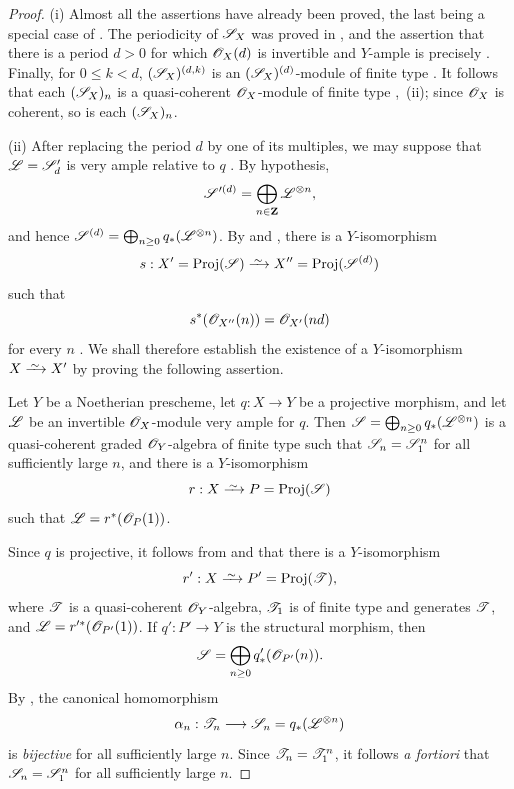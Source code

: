 \begin{proof}
(i) Almost all the assertions have already been proved, the last being a special case of .
The periodicity of $\mathscr{S}_X$ was proved in , and the assertion that there is a period $d>0$ for which $\mathscr{O}_X(d)$ is invertible and $Y$-ample is precisely .
Finally, for $0\leq k<d$, $(\mathscr{S}_X)^{(d,k)}$ is an $(\mathscr{S}_X)^{(d)}$-module of finite type .
It follows that each $(\mathscr{S}_X)_n$ is a quasi-coherent $\mathscr{O}_X$-module of finite type ,~(ii); since $\mathscr{O}_X$ is coherent, so is each $(\mathscr{S}_X)_n$.

(ii) After replacing the period $d$ by one of its multiples, we may suppose that $\mathscr{L}=\mathscr{S}'_d$
is very ample relative to $q$ .
By hypothesis,
\[
  \mathscr{S}'^{(d)}
  =\bigoplus_{n\in\mathbf{Z}}\mathscr{L}^{\otimes n},
\]
and hence $\mathscr{S}^{(d)}
=\bigoplus_{n\geq0}q_*(\mathscr{L}^{\otimes n})$.
By  and , there is a $Y$-isomorphism
\[
  s:X'=\Proj(\sh{S})\simto
  X''=\Proj(\sh{S}^{(d)})
\]
such that
\[
  s^*(\mathscr{O}_{X''}(n))=\mathscr{O}_{X'}(nd)
\]
for every $n$ .
We shall therefore establish the existence of a $Y$-isomorphism $X\simto X'$ by proving the following assertion.

\begin{proposition}[2.3.4.1]
\label{III.2.3.4.1}
Let $Y$ be a Noetherian prescheme, let $q:X\to Y$ be a projective morphism, and let $\mathscr{L}$ be an invertible $\mathscr{O}_X$-module very ample for $q$.
Then $\mathscr{S}=\bigoplus_{n\geq0}q_*(\mathscr{L}^{\otimes n})$
is a quasi-coherent graded $\mathscr{O}_Y$-algebra of finite type such that $\mathscr{S}_n=\mathscr{S}_1^n$
for all sufficiently large $n$, and there is a $Y$-isomorphism
\[
  r:X\simto P=\Proj(\sh{S})
\]
such that $\mathscr{L}=r^*(\mathscr{O}_P(1))$.
\end{proposition}

Since $q$ is projective, it follows from  and  that there is a $Y$-isomorphism
\[
  r':X\simto P'=\Proj(\sh{T}),
\]
where $\mathscr{T}$ is a quasi-coherent $\mathscr{O}_Y$-algebra, $\mathscr{T}_1$ is of finite type and generates $\mathscr{T}$, and $\mathscr{L}=r'^*(\mathscr{O}_{P'}(1))$.
If $q':P'\to Y$ is the structural morphism, then
\[
  \mathscr{S}=\bigoplus_{n\geq0}q'_*(\mathscr{O}_{P'}(n)).
\]
By , the canonical homomorphism
\[
  \alpha_n:\mathscr{T}_n\longrightarrow
  \mathscr{S}_n=q_*(\mathscr{L}^{\otimes n})
\]
is \emph{bijective} for all sufficiently large $n$.
Since $\mathscr{T}_n=\mathscr{T}_1^n$, it follows \emph{a fortiori} that $\mathscr{S}_n=\mathscr{S}_1^n$ for all sufficiently large $n$.


\end{proof}
